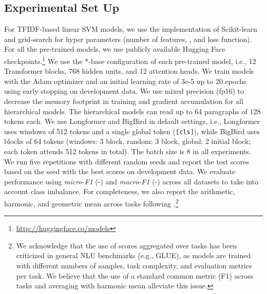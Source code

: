 \documentclass[11pt]{article}
\newcommand{\macrof}{-\xspace}
\newcommand{\microf}{-\xspace}
\newcommand{\cls}{\texttt{\small [cls]}\xspace}
\begin{document}
\subsection{Experimental Set Up}

For TFIDF-based linear SVM models, we use the implementation of Scikit-learn \cite{scikit-learn} and grid-search for hyper parameters (number of features, , and loss function).
For all the pre-trained models, we use publicly available Hugging Face checkpoints.\footnote{\url{http://huggingface.co/models}} We use the *-base configuration of each pre-trained model, i.e., 12 Transformer blocks, 768 hidden units, and 12 attention heads. We train models with the Adam optimizer \cite{Kingma2015} and an initial learning rate of 3e-5 up to 20 epochs using early stopping on development data. We use mixed precision (fp16) to decrease the memory footprint in training and gradient accumulation for all hierarchical models.
The hierarchical models can read up to 64 paragraphs of 128 tokens each. We use Longformer and BigBird in default settings, i.e., Longformer uses windows of 512 tokens and a single global token (\cls), while BigBird uses blocks of 64 tokens (windows: 3 block, random: 3 block, global: 2 initial block; each token attends 512 tokens in total).  The batch size is 8 in all experiments. We run five repetitions with different random seeds and report the test scores based on the seed with the best scores on development data. We evaluate performance using \emph{micro-F1} (\microf) and \emph{macro-F1} (\macrof) across all datasets to take into account class imbalance. For completeness, we also report the arithmetic, harmonic, and geometric mean across tasks following \citet{shavrina2021how}.\footnote{We acknowledge that the use of scores aggregated over tasks has been criticized in general NLU benchmarks (e.g., GLUE), as models are trained with different numbers of samples, task complexity, and evaluation metrics per task. We believe that the use of a standard common metric (F1) across tasks and averaging with harmonic mean alleviate this issue.}
\vspace{-1mm}
\end{document}
